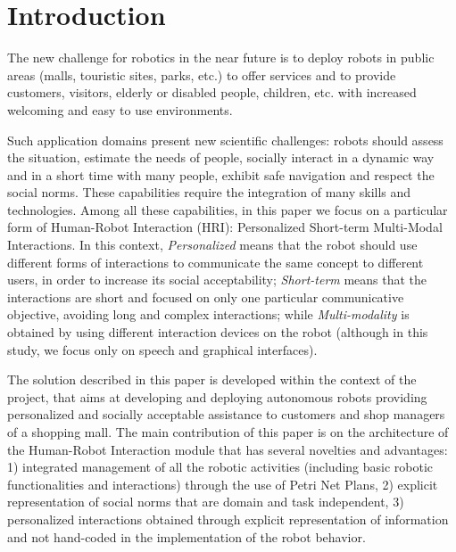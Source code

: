 \section{Introduction}
\vspace{-0.1cm}

The new challenge for robotics in the near future is to deploy robots in public areas (malls, touristic sites, parks, etc.) to offer services and to provide customers, visitors, elderly or disabled people, children, etc.  with increased welcoming and easy to use environments. 

Such application domains present new scientific challenges: robots should assess the situation, estimate the needs of people, socially interact in a dynamic way and in a short time with many people, exhibit safe navigation and respect the social norms. These capabilities require the integration of many skills and technologies.
Among all these capabilities, in this paper we focus on a particular form of Human-Robot Interaction (HRI):
Personalized Short-term Multi-Modal Interactions.
In this context, \emph{Personalized} means that the robot should use different forms of interactions to communicate the same concept to different users, in order to increase its social acceptability;
\emph{Short-term} means that the interactions are short and focused on only one particular communicative objective, avoiding long and complex interactions; while
\emph{Multi-modality} is obtained by using different interaction devices on the robot (although in this study, we focus only on speech and graphical interfaces).

The solution described in this paper is developed within the context of the {\coaches}  project, 
that aims at developing and deploying autonomous robots providing personalized and socially acceptable assistance to customers and shop managers of a shopping mall.
The main contribution of this paper is on the architecture of the Human-Robot Interaction module that has several novelties and advantages: 1) integrated management of all the robotic activities (including basic robotic functionalities and interactions) through the use of Petri Net Plans, 2) explicit representation of social norms that are domain and task independent, 3) personalized interactions obtained through explicit representation of information and not hand-coded in the implementation of the robot behavior.

